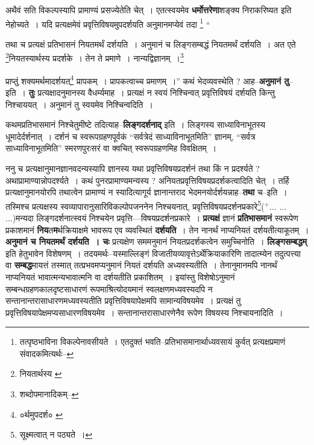 \documentclass[article,12pt,a4paper]{memoir}
\newcommand{\add}[1]{($^{+}$#1)}
\begin{document}
	  \pstart अथैवं सति विकल्पस्यापि प्रामाण्यं प्रसज्येतेति चेत् । एतत्स्वयमेव \textbf{धर्मोत्तरेणा}शङ्क्य निराकरिष्यत इति नेहोच्यते । यदि प्रत्यक्षमेवं प्रवृत्तिविषयमुपदर्शयति अनुमानमप्येवं तदा  \footnote{तत्पृष्ठभाविना विकल्पेनावसीयते । एतदुक्तं भवति--प्रतिभासमानार्थाध्यवसायं कुर्वत् प्रत्यक्षप्रमाणं संवादकमित्यर्थः--\cite{dp-msD-n}}  \leavevmode{} “
	  
	तथा च प्रत्यक्षं प्रतिभासनं नियतमर्थं दर्शयति । अनुमानं च लिङ्गसम्बद्धं नियतमर्थं दर्शयति । अत एते \footnote{नियतार्थस्य \cite{dp-msB}}नियतस्यार्थस्य प्रदर्शके । तेन ते प्रमाणे । नान्यद्विज्ञानम् ।\footnote{शब्दोपमानादिकम्--\cite{dp-msD-n}} 
	  
	प्राप्तुं शक्यमर्थमादर्शयत्\footnote{०र्थमुपदर्श० \cite{dp-msC} \cite{dp-msD} \cite{dp-msB}} प्रापकम् । प्रापकत्वाच्च प्रमाणम् ।” कथं भेदव्यवस्थेति ? आह--\textbf{अनुमानं तु}--इति । \textbf{तुः} प्रत्यक्षादनुमानस्य वैधर्म्यमाह । प्रत्यक्षं न स्वयं निश्चिन्वत् प्रवृत्तिविषयं दर्शयति किन्तु निश्चाययत् । अनुमानं तु स्वयमेव निश्चिन्वदिति ।
	\pend
      

	  \pstart कथमप्रतिभासमानं निश्चेतुमीष्टे तदित्याह--\textbf{लिङ्गदर्शनाद्} इति । लिङ्गस्य साध्याविनाभूतस्य धूमादेर्दर्शनात् । दर्शनं च स्वरूपग्रहणपूर्वकं “सर्वत्रेदं साध्याविनाभूतमिति” ज्ञानम्, “सर्वत्र साध्याविनाभूतमिति” स्मरणपुरःसरं वा क्वचित् स्वरूपग्रहणमिह विवक्षितम् ।
	\pend
      

	  \pstart ननु च प्रत्यक्षानुमानज्ञानवदन्यस्यापि ज्ञानस्य यथा प्रवृत्तिविषयप्रदर्शनं तथा किं न प्रदर्श्यते ? अथाप्रामाण्यान्नोपदर्श्यते । कथं पुनरप्रामाण्यमन्यस्य ? अनियतप्रवृत्तिविषयप्रदर्शकत्वादिति चेत् । तर्हि प्रत्यक्षानुमानयोरपि तथात्वेन प्रामाण्यं न स्यादित्यागूर्य ज्ञानान्तराद भेदमनयोर्दर्शयन्नाह--\textbf{तथा} च--इति । तस्मिश्च प्रत्यक्षस्य स्वव्यापारानुसारिविकल्पोपजननेन निश्चयनात्, प्रवृत्तिविषयप्रदर्शनप्रकारे\footnote{सूक्ष्मत्वात् न पठ्यते ।}\add{... ... ...}मन्यदा लिङ्गदर्शनात्स्वयं निश्चयेन प्रवृत्ति—विषयप्रदर्शनप्रकारे । \textbf{प्रत्यक्षं} ज्ञानं \textbf{प्रतिभासमानं} स्वरूपेण प्रकाशमानं \textbf{निय}त\textbf{म}र्थक्रियाक्षमे भावरूप एव व्यवस्थितं \textbf{दर्शयति} । तेन नानर्थं नाप्यनियतं दर्शयतीत्याकूतम् । \textbf{अनुमानं च नियतमर्थं दर्शयति । चः} प्रत्यक्षेण सममनुमानं नियतप्रदर्शकत्वेन समुच्चिनोति । \textbf{लिङ्गसम्बद्धम्} इति हेतुभावेन विशेषणम् । तदयमर्थः--यस्माल्लिङ्गं विजातीयव्यावृत्तेऽर्थेक्रियाकारिणि तादात्म्येन तदुत्पत्त्या वा \textbf{सम्बद्ध}मायत्तं तस्मात् तत्प्रभवमप्यनुमानं नियतं दर्शयति अध्यवस्यतीति । तेनानुमानमपि नानर्थं नाप्यनियतं भावात्मन्यभावात्मनि वा दर्शयतीति प्रकाशितम् । इयांस्तु विशेषोऽनुमानं सम्बन्धग्रहणकालदृष्टसाधारणं रूपमाश्रित्योदयमानं स्वलक्षणमध्यवस्यदपि न सन्तानान्तरासाधारणमध्यवस्यतीति प्रवृत्तिविषयापेक्षमपि सामान्यविषयमेव । प्रत्यक्षं तु प्रवृत्तिविषयापेक्षमप्यसाधारणविषयमेव । सन्तानान्तरासाधा\leavevmode{}रणेनैव रूपेण विषयस्य निश्चायनादिति ।
	\pend
      
\end{document}
